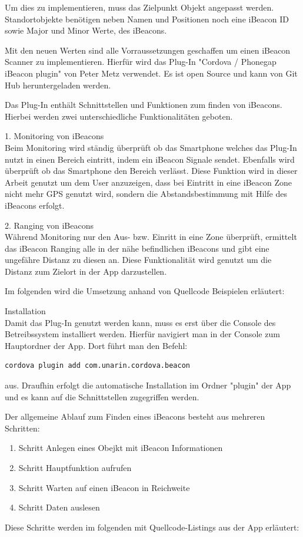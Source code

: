 Um dies zu implementieren, muss das Zielpunkt Objekt angepasst werden. Standortobjekte benötigen neben Namen und Positionen noch eine iBeacon ID sowie Major und Minor Werte, des iBeacons.

Mit den neuen Werten sind alle Vorraussetzungen geschaffen um einen iBeacon Scanner zu implementieren. Hierfür wird das Plug-In "Cordova / Phonegap iBeacon plugin" von Peter Metz verwendet. \cite{petermetz} Es ist open Source und kann von Git Hub heruntergeladen werden.

Das Plug-In enthält Schnittstellen und Funktionen zum finden von iBeacons. Hierbei werden zwei unterschiedliche Funktionalitäten geboten.


1. Monitoring von iBeacons
\\Beim Monitoring wird ständig überprüft ob das Smartphone welches das Plug-In nutzt in einen Bereich eintritt, indem ein iBeacon Signale sendet. Ebenfalls wird überprüft ob das Smartphone den Bereich verlässt. Diese Funktion wird in dieser Arbeit genutzt um dem User anzuzeigen, dass bei Eintritt in eine iBeacon Zone nicht mehr GPS genutzt wird, sondern die Abstandsbestimmung mit Hilfe des iBeacons erfolgt.

2. Ranging von iBeacons
\\Während Monitoring nur den Aus- bzw. Einritt in eine Zone überprüft, ermittelt das iBeacon Ranging alle in der nähe befindlichen iBeacons und gibt eine ungefähre Distanz zu diesen an. Diese Funktionalität wird genutzt um die Distanz zum Zielort in der App darzustellen.\cite{MonitorRange}


Im folgenden wird die Umsetzung anhand von Quellcode Beispielen erläutert:

Installation
\\Damit das Plug-In genutzt werden kann, muss es erst über die Console des Betreibssystem installiert werden.
Hierfür navigiert man in der Console zum Hauptordner der App. Dort führt man den Befehl:

\begin{lstlisting}
cordova plugin add com.unarin.cordova.beacon
\end{lstlisting} 


aus. Draufhin erfolgt die automatische Installation im Ordner "plugin" der App und es kann auf die Schnittstellen zugegriffen werden.

Der allgemeine Ablauf zum Finden eines iBeacons besteht aus mehreren Schritten:
\begin{enumerate}
\item Schritt Anlegen eines Obejkt mit iBeacon Informationen
\item Schritt Hauptfunktion aufrufen
\item Schritt Warten auf einen iBeacon in Reichweite
\item Schritt Daten auslesen
\end{enumerate}
Diese Schritte werden im folgenden mit Quellcode-Listings aus der App erläutert:

